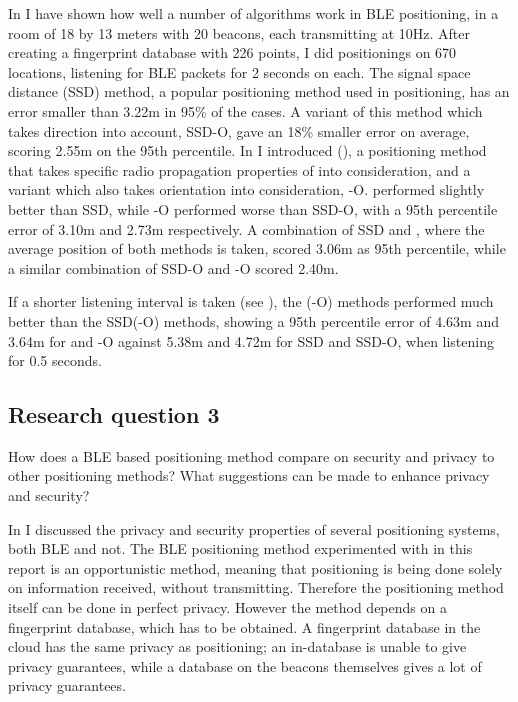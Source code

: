 In  I have shown how well a number of algorithms work in BLE positioning, in a room of 18 by 13 meters with 20 beacons, each transmitting at 10Hz.
After creating a fingerprint database with 226 points, I did positionings on 670 locations, listening for BLE packets for 2 seconds on each.
The signal space distance (SSD) method, a popular positioning method used in \wifi positioning, has an error smaller than 3.22m in 95\% of the cases.
A variant of this method which takes direction into account, SSD-O, gave an 18\% smaller error on average, scoring 2.55m on the 95th percentile.
In  I introduced \BRP (\aBRP), a positioning method that takes specific radio propagation properties of \BLE into consideration, and a variant which also takes orientation into consideration, \aBRP-O.
\aBRP performed slightly better than SSD, while \aBRP-O performed worse than SSD-O, with a 95th percentile error of 3.10m and 2.73m respectively.
A combination of SSD and \aBRP, where the average position of both methods is taken, scored 3.06m as 95th percentile, while a similar combination of SSD-O and \aBRP-O scored 2.40m.

If a shorter listening interval is taken (see ), the \aBRP(-O) methods performed much better than the SSD(-O) methods, showing a 95th percentile error of 4.63m and 3.64m for \aBRP and \aBRP-O against 5.38m and 4.72m for SSD and SSD-O, when listening for 0.5 seconds.

\subsection{Research question 3}
\begin{em}
    How does a BLE based positioning method compare on security and privacy to other positioning methods?
    What suggestions can be made to enhance privacy and security?
\end{em}

In  I discussed the privacy and security properties of several positioning systems, both BLE and not.
The BLE positioning method experimented with in this report is an opportunistic method, meaning that positioning is being done solely on information received, without transmitting.
Therefore the positioning method itself can be done in perfect privacy.
However the method depends on a fingerprint database, which has to be obtained.
A fingerprint database in the cloud has the same privacy as \wifi positioning; an in-\app database is unable to give privacy guarantees, while a database on the beacons themselves gives a lot of privacy guarantees.


